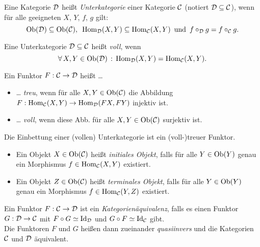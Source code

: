 \documentclass{cheat-sheet}
\begin{document}

\begin{defn}
  Eine Kategorie $\mathcal{D}$ heißt \emph{Unterkategorie} einer Kategorie $\mathcal{C}$ (notiert $\mathcal{D} \subseteq \mathcal{C}$), wenn für alle geeigneten $X$, $Y$, $f$, $g$ gilt:
  \[
    \operatorname{Ob}(\mathcal{D}) \subseteq \operatorname{Ob}(\mathcal{C}), \enspace
    \operatorname{Hom}_{\mathcal{D}}(X, Y) \subseteq \operatorname{Hom}_{\mathcal{C}}(X, Y) \enspace \text{und} \enspace
    f \circ_{\mathcal{D}} g = f \circ_{\mathcal{C}} g.
  \]
\end{defn}

\begin{defn}
  Eine Unterkategorie $\mathcal{D} \subseteq \mathcal{C}$ heißt \emph{voll}, wenn
  \[ \forall \, {X, Y \in \operatorname{Ob}(\mathcal{D})} \,:\, \operatorname{Hom}_{\mathcal{D}}(X, Y) = \operatorname{Hom}_{\mathcal{C}}(X, Y). \]
\end{defn}

\begin{defn}
  Ein Funktor $F : \mathcal{C} \to \mathcal{D}$ heißt \ldots
  \begin{itemize}
    \item \ldots{} \emph{treu}, wenn für alle $X, Y \in \operatorname{Ob}(\mathcal{C})$ die Abbildung
    $F : \operatorname{Hom}_{\mathcal{C}}(X, Y) \to \operatorname{Hom}_{\mathcal{D}}(FX, FY)$
    injektiv ist.
    \item \ldots{} \emph{voll}, wenn diese Abb. für alle $X, Y \in \operatorname{Ob}(\mathcal{C})$ surjektiv ist.
  \end{itemize}
\end{defn}

\begin{bem}
  Die Einbettung einer (vollen) Unterkategorie ist ein (voll-)treuer Funktor.
\end{bem}

\begin{defn}
  \begin{itemize}
    \item Ein Objekt $X \in \operatorname{Ob}(\mathcal{C})$ heißt \emph{initiales Objekt}, falls für alle $Y \in \operatorname{Ob}(Y)$ genau ein Morphismus $f \in \operatorname{Hom}_{\mathcal{C}}(X, Y)$ existiert.
    \item Ein Objekt $Z \in \operatorname{Ob}(\mathcal{C})$ heißt \emph{terminales Objekt}, falls für alle $Y \in \operatorname{Ob}(Y)$ genau ein Morphismus $f \in \operatorname{Hom}_{\mathcal{C}}(Y, Z)$ existiert.
  \end{itemize}
\end{defn}




\begin{defn}
  Ein Funktor $F : \mathcal{C} \to \mathcal{D}$ ist ein \emph{Kategorienäquivalenz}, falls es einen Funktor $G : \mathcal{D} \to \mathcal{C}$ mit $F \circ G \simeq \operatorname{Id}_{\mathcal{D}}$ und $G \circ F \simeq \operatorname{Id}_{\mathcal{C}}$ gibt. \\
  Die Funktoren $F$ und $G$ heißen dann zueinander \emph{quasiinvers} und die Kategorien $\mathcal{C}$ und $\mathcal{D}$ äquivalent.
\end{defn}
\end{document}
